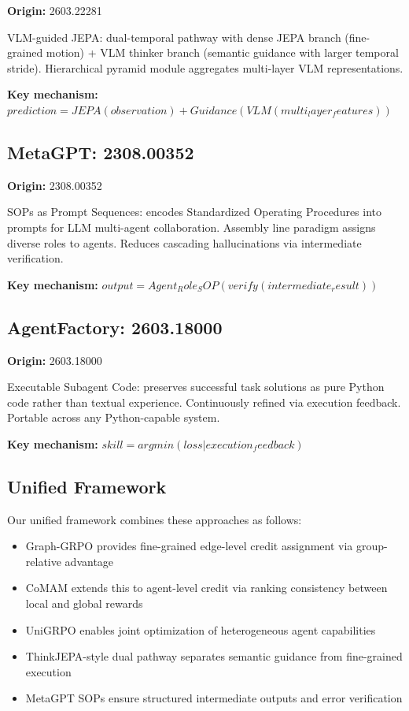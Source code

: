 \documentclass[11pt]{article}
\begin{document}
{\bf Origin:} 2603.22281

VLM-guided JEPA: dual-temporal pathway with dense JEPA branch (fine-grained motion) + VLM thinker branch (semantic guidance with larger temporal stride). Hierarchical pyramid module aggregates multi-layer VLM representations.

{\bf Key mechanism:} $prediction = JEPA(observation) + Guidance(VLM(multi_layer_features))$

\subsection{MetaGPT: 2308.00352}

{\bf Origin:} 2308.00352

SOPs as Prompt Sequences: encodes Standardized Operating Procedures into prompts for LLM multi-agent collaboration. Assembly line paradigm assigns diverse roles to agents. Reduces cascading hallucinations via intermediate verification.

{\bf Key mechanism:} $output = Agent_Role_SOP(verify(intermediate_result))$

\subsection{AgentFactory: 2603.18000}

{\bf Origin:} 2603.18000

Executable Subagent Code: preserves successful task solutions as pure Python code rather than textual experience. Continuously refined via execution feedback. Portable across any Python-capable system.

{\bf Key mechanism:} $skill = argmin(loss | execution_feedback)$

\subsection{Unified Framework}

Our unified framework combines these approaches as follows:
\begin{itemize}
\item Graph-GRPO provides fine-grained edge-level credit assignment via group-relative advantage
\item CoMAM extends this to agent-level credit via ranking consistency between local and global rewards
\item UniGRPO enables joint optimization of heterogeneous agent capabilities
\item ThinkJEPA-style dual pathway separates semantic guidance from fine-grained execution
\item MetaGPT SOPs ensure structured intermediate outputs and error verification
\end{itemize}
\end{document}
